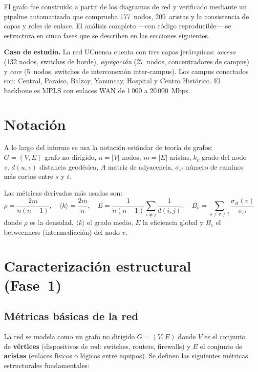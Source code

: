 \documentclass[11pt, a4paper]{article}
\newcommand{\prom}[1]{\langle #1 \rangle}
\begin{document}
El grafo fue construido a partir de los diagramas de red y verificado mediante
un pipeline automatizado que comprueba 177~nodos, 209~aristas y la consistencia
de capas y roles de enlace. El análisis completo ---con código reproducible---
se estructura en cinco fases que se describen en las secciones siguientes.

\textbf{Caso de estudio.} La red UCuenca cuenta con tres capas jerárquicas:
\textit{acceso} (132 nodos, switches de borde), \textit{agregación}
(27~nodos, concentradores de campus) y \textit{core} (5~nodos, switches de
interconexión inter-campus). Los campus conectados son: Central, Paraíso,
Balzay, Yanuncay, Hospital y Centro Histórico. El backbone es MPLS con enlaces
WAN de 1\,000 a 20\,000~Mbps.

\section*{Notación}

A lo largo del informe se usa la notación estándar de teoría de grafos:
$G=(V,E)$ grafo no dirigido, $n=|V|$ nodos, $m=|E|$ aristas, $k_v$ grado del
nodo $v$, $d(u,v)$ distancia geodésica, $A$ matriz de adyacencia,
$\sigma_{st}$ número de caminos más cortos entre $s$ y $t$.

Las métricas derivadas más usadas son:
\[
  \rho = \frac{2m}{n(n-1)}, \quad
  \prom{k} = \frac{2m}{n}, \quad
  E = \frac{1}{n(n-1)}\sum_{i\neq j}\frac{1}{d(i,j)}, \quad
  B_v = \sum_{s\neq v\neq t}\frac{\sigma_{st}(v)}{\sigma_{st}}
\]
donde $\rho$ es la densidad, $\prom{k}$ el grado medio, $E$ la eficiencia
global y $B_v$ el betweenness (intermediación) del nodo $v$.

\section{Caracterización estructural (Fase~1)}

\subsection{Métricas básicas de la red}

La red se modela como un grafo no dirigido $G=(V,E)$ donde $V$ es el conjunto
de \textbf{vértices} (dispositivos de red: switches, routers, firewalls) y $E$
el conjunto de \textbf{aristas} (enlaces físicos o lógicos entre equipos).
Se definen las siguientes métricas estructurales fundamentales:
\end{document}
